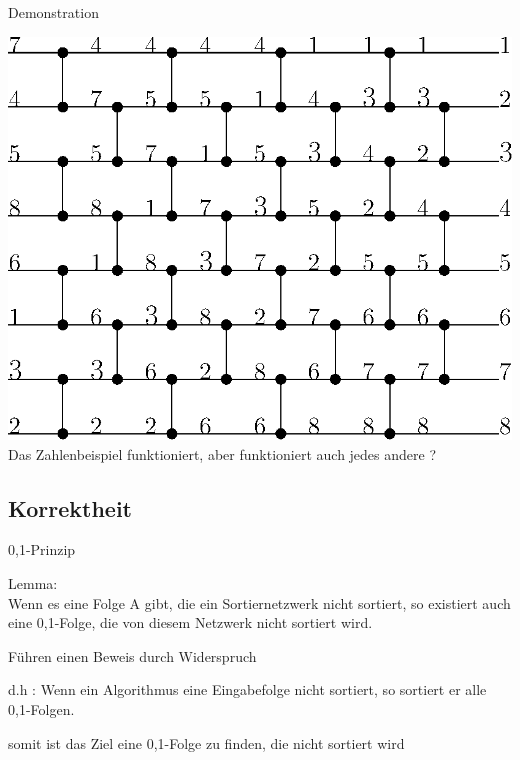 \documentclass[ucs,9pt]{beamer}
\begin{document}
\begin{frame}{Demonstration}
\begin{center}
   \includegraphics[scale=0.8]{bild2beispiel.eps}\\
 {Das Zahlenbeispiel funktioniert, aber funktioniert auch jedes andere ?}\\
  \end{center}
\end{frame}

\subsection{Korrektheit}
\begin{frame}{0,1-Prinzip}
\vfill
{} {
\begin{center}
\begin{minipage}[c]{9cm}
Lemma: \\
Wenn es eine Folge A gibt, die ein Sor\-tier\-netz\-werk nicht sortiert, so existiert auch eine 0,1-Folge, die von diesem Netzwerk nicht sortiert wird.
\end{minipage}
\vfill
\end{center}
}
\begin{itemize}
 { \item Führen einen Beweis durch Widerspruch \\}
 { \item d.h : Wenn ein Algorithmus eine Eingabefolge nicht sortiert, so sortiert er alle 0,1-Folgen. }
 { \item somit ist das Ziel eine 0,1-Folge zu finden, die nicht sortiert wird}
\end{itemize} 
\end{frame}
\end{document}
